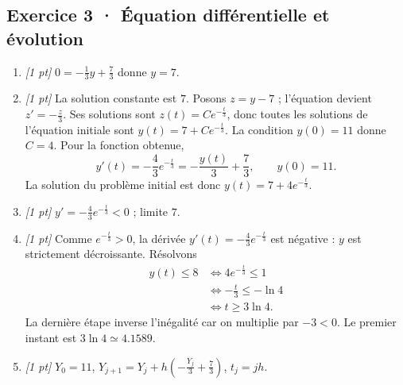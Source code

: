 \subsection*{Exercice 3 · Équation différentielle et évolution}\begin{enumerate}

\item \textit{[1 pt]} $0=-\frac{1}{3}y+\frac{7}{3}$ donne $y=7$.

\item \textit{[1 pt]} La solution constante est $7$. Posons $z=y-7$ ; l'équation devient $z'=-\frac{z}{3}$. Ses solutions sont $z(t)=Ce^{-\frac{t}{3}}$, donc toutes les solutions de l'équation initiale sont $y(t)=7+Ce^{-\frac{t}{3}}$.
La condition $y(0)=11$ donne $C=4$. Pour la fonction obtenue,
\[y'(t)=-\frac{4}{3}e^{-\frac{t}{3}}=-\frac{y(t)}{3}+\frac{7}{3},\qquad y(0)=11.\]
La solution du problème initial est donc $y(t)=7+4e^{-\frac{t}{3}}$.

\item \textit{[1 pt]} $y'=-\frac{4}{3}e^{-\frac{t}{3}}<0$ ; limite $7$.

\item \textit{[1 pt]} Comme $e^{-\frac{t}{3}}>0$, la dérivée $y'(t)=-\frac{4}{3}e^{-\frac{t}{3}}$ est négative : $y$ est strictement décroissante. Résolvons
\[\begin{aligned}y(t)\le 8&\Longleftrightarrow 4e^{-\frac{t}{3}}\le1\\&\Longleftrightarrow -\frac{t}{3}\le-\ln 4\\&\Longleftrightarrow t\ge 3\ln 4.\end{aligned}\]
La dernière étape inverse l'inégalité car on multiplie par $-3<0$. Le premier instant est $3\ln 4\simeq\num{4,1589}$.

\item \textit{[1 pt]} $Y_0=11$, $Y_{j+1}=Y_j+h(-\frac{Y_j}{3}+\frac{7}{3})$, $t_j=jh$.

\end{enumerate}

